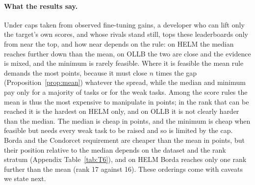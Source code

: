 \documentclass{article}
\begin{document}
\paragraph{What the results say.}
Under caps taken from observed fine-tuning gains, a developer who can lift only the target's own scores, and whose rivals stand still, tops these leaderboards only from near the top, and how near depends on the rule: on HELM the median reaches further down than the mean, on OLLB the two are close and the evidence is mixed, and the minimum is rarely feasible. Where it is feasible the mean rule demands the most points, because it must close $n$ times the gap (Proposition~\ref{prop:mean}) whatever the spread, while the median and minimum pay only for a majority of tasks or for the weak tasks. Among the score rules the mean is thus the most expensive to manipulate in points; in the rank that can be reached it is the hardest on HELM only, and on OLLB it is not clearly harder than the median. The median is cheap in points, and the minimum is cheap when feasible but needs every weak task to be raised and so is limited by the cap. Borda and the Condorcet requirement are cheaper than the mean in points, but their position relative to the median depends on the dataset and the rank stratum (Appendix Table~\ref{tab:T6}), and on HELM Borda reaches only one rank further than the mean (rank 17 against 16). These orderings come with caveats we state next.
\end{document}
